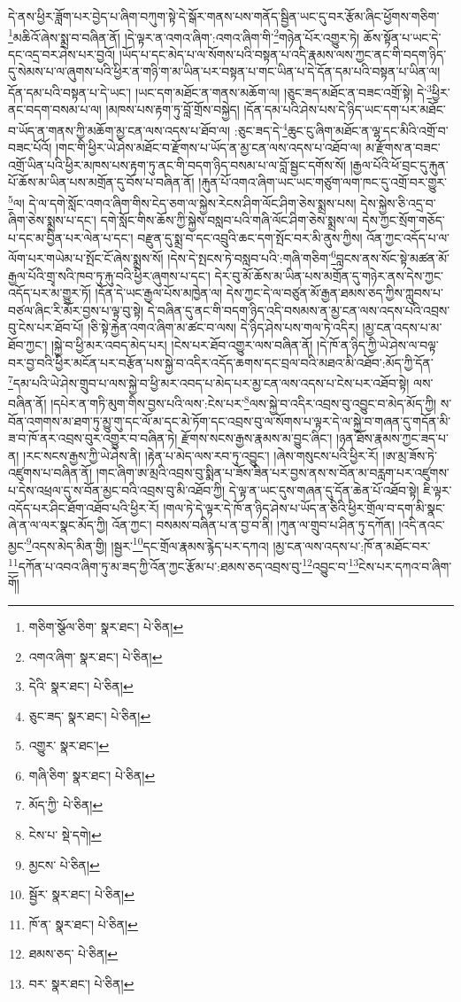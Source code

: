 དེ་ནས་ཕྱིར་ཟློག་པར་བྱེད་པ་ཞིག་བཀུག་སྟེ་དེ་སྒོར་གནས་པས་གནོད་སྦྱིན་ཡང་དུ་བར་རྩོམ་ཞིང་ཕྱོགས་གཅིག་\footnote{གཅིག་སྩོལ་ཅིག་  སྣར་ཐང་།  པེ་ཅིན། }མཆིའོ་ཞེས་སྨྲ་བ་བཞིན་ནོ། །དེ་ལྟར་ན་འགའ་ཞིག་:འགའ་ཞིག་གི་\footnote{འགའ་ཞིག་  སྣར་ཐང་།  པེ་ཅིན། }གཉེན་པོར་འགྱུར་ཏེ། ཆོས་སྟོན་པ་ཡང་དེ་དང་འདྲ་བར་ཤེས་པར་བྱའོ། །ཡོད་པ་དང་མེད་པ་ལ་སོགས་པའི་བསྟན་པ་འདི་རྣམས་ལས་ཀྱང་ནང་གི་བདག་ཉིད་དུ་སེམས་པ་ལ་ཞུགས་པའི་ཕྱིར་ན་གཉི་ག་མ་ཡིན་པར་བསྟན་པ་གང་ཡིན་པ་དེ་དོན་དམ་པའི་བསྟན་པ་ཡིན་ལ། དོན་དམ་པའི་བསྟན་པ་དེ་ཡང་། །ཡང་དག་མཐོང་ན་གནས་མཆོག་ལ། །ཅུང་ཟད་མཐོང་ན་བཟང་འགྲོ་སྟེ། དེ་\footnote{དེའི་  སྣར་ཐང་།  པེ་ཅིན། }ཕྱིར་ནང་བདག་བསམ་པ་ལ། །མཁས་པས་རྟག་ཏུ་བློ་གྲོས་བསྐྱེད། །དོན་དམ་པའི་ཤེས་པས་དེ་ཉིད་ཡང་དག་པར་མཐོང་བ་ཡོད་ན་གནས་ཀྱི་མཆོག་མྱ་ངན་ལས་འདས་པ་ཐོབ་ལ། :ཅུང་ཟད་དེ་\footnote{ཅུང་ཟད་  སྣར་ཐང་།  པེ་ཅིན། }ཆུང་ངུ་ཞིག་མཐོང་ན་ལྷ་དང་མིའི་འགྲོ་བ་བཟང་པོའོ། །གང་གི་ཕྱིར་ཡེ་ཤེས་མཐོང་བ་རྫོགས་པ་ཡོད་ན་མྱ་ངན་ལས་འདས་པ་འཐོབ་ལ། མ་རྫོགས་ན་བཟང་འགྲོ་ཡིན་པའི་ཕྱིར་མཁས་པས་རྟག་ཏུ་ནང་གི་བདག་ཉིད་བསམ་པ་ལ་བློ་སྦྱང་དགོས་སོ། །རྒྱལ་པོའི་ཕོ་བྲང་དུ་རྐུན་པོ་ཆོས་མ་ཡིན་པས་མགྲོན་དུ་བོས་པ་བཞིན་ནོ། །རྐུན་པོ་འགའ་ཞིག་ཡང་ཡང་གཙུག་ལག་ཁང་དུ་འགྲོ་བར་གྱུར་\footnote{འགྱུར་  སྣར་ཐང་། }ལ། དེ་ལ་དགེ་སློང་འགའ་ཞིག་གིས་ངེད་ཅག་ལ་སྐྱེས་རེངས་ཤིག་ལོང་ཤིག་ཅེས་སྨྲས་པས། དེས་སྐྱེས་ཅི་འདྲ་བ་ཞིག་ཅེས་སྨྲས་པ་དང་། དགེ་སློང་གིས་ཆོས་ཀྱི་སྐྱེས་བསླབ་པའི་གཞི་ལོང་ཤིག་ཅེས་སྨྲས་ལ། དེས་ཀྱང་སྲོག་གཅོད་པ་དང་མ་བྱིན་པར་ལེན་པ་དང་། བརྫུན་དུ་སྨྲ་བ་དང་འབྲུའི་ཆང་དག་སྤོང་བར་མི་ནུས་ཀྱིས། འོན་ཀྱང་འདོད་པ་ལ་ལོག་པར་གཡེམ་པ་སྤོང་ངོ་ཞེས་སྨྲས་སོ། །དེས་དེ་སྤངས་ཏེ་བསླབ་པའི་:གཞི་གཅིག་\footnote{གཞི་ཅིག་  སྣར་ཐང་།  པེ་ཅིན། }བླངས་ནས་སོང་སྟེ་མཚན་མོ་རྒྱལ་པོའི་གྲྭ་སའི་ཁབ་ཏུ་རྐུ་བའི་ཕྱིར་ཞུགས་པ་དང་། དེར་བུ་མོ་ཆོས་མ་ཡིན་པས་མགྲོན་དུ་གཉེར་ནས་དེས་ཀྱང་འདོད་པར་མ་གྱུར་ཏོ། །དོན་དེ་ཡང་རྒྱལ་པོས་མཁྱེན་ལ། དེས་ཀྱང་དེ་ལ་བཙུན་མོ་རྒྱན་ཐམས་ཅད་ཀྱིས་ཀླུབས་པ་བཙལ་ཞིང་རི་མོར་བྱས་པ་ལྟ་བུ་སྟེ། དེ་བཞིན་དུ་ནང་གི་བདག་ཉིད་འདི་བསམས་ན་མྱ་ངན་ལས་འདས་པའི་འབྲས་བུ་ངེས་པར་ཐོབ་པོ། །ཅི་སྟེ་རྐྱེན་འགའ་ཞིག་མ་ཚང་བ་ལས། དེ་ཉིད་ཤེས་པས་གལ་ཏེ་འདིར། །མྱ་ངན་འདས་པ་མ་ཐོབ་ཀྱང་། །སྐྱེ་བ་ཕྱི་མར་འབད་མེད་པར། །ངེས་པར་ཐོབ་འགྱུར་ལས་བཞིན་ནོ། །དེ་ཁོ་ན་ཉིད་ཀྱི་ཡེ་ཤེས་ལ་བལྟ་བར་བྱ་བའི་ཕྱིར་མངོན་པར་བརྩོན་པས་སྐྱེ་བ་འདིར་འདོད་ཆགས་དང་བྲལ་བའི་མཐའ་མི་འཐོབ་:མོད་ཀྱི་དོན་\footnote{མོད་ཀྱི་  པེ་ཅིན། }དམ་པའི་ཡེ་ཤེས་གྲུབ་པ་ལས་སྐྱེ་བ་ཕྱི་མར་འབད་པ་མེད་པར་མྱ་ངན་ལས་འདས་པ་ངེས་པར་འཐོབ་སྟེ། ལས་བཞིན་ནོ། །དཔེར་ན་གཏི་མུག་གིས་བྱས་པའི་ལས་:ངེས་པར་\footnote{ངེས་པ་  སྡེ་དགེ། }ལས་སྐྱེ་བ་འདིར་འབྲས་བུ་འབྱུང་བ་མེད་མོད་ཀྱི། ས་བོན་འགགས་མ་ཐག་ཏུ་མྱུ་གུ་དང་ལོ་མ་དང་མེ་ཏོག་དང་འབྲས་བུ་ལ་སོགས་པ་ལྟར་དེ་ལ་སྐྱེ་བ་གཞན་དུ་གདོན་མི་ཟ་བ་ཁོ་ནར་འབྲས་བུར་འགྱུར་བ་བཞིན་ཏེ། རྫོགས་སངས་རྒྱས་རྣམས་མ་བྱུང་ཞིང་། །ཉན་ཐོས་རྣམས་ཀྱང་ཟད་པ་ན། །རང་སངས་རྒྱས་ཀྱི་ཡེ་ཤེས་ནི། །རྟེན་པ་མེད་ལས་རབ་ཏུ་འབྱུང་། །ཞེས་གསུངས་པའི་ཕྱིར་རོ། །ཨ་མྲ་ཟོས་ཏེ་འཛུགས་པ་བཞིན་ནོ། །གང་ཞིག་ཨ་མྲའི་འབྲས་བུ་སྨིན་པ་ཟོས་ཟིན་པར་བྱས་ནས་ས་བོན་མ་བརླག་པར་འཛུགས་པ་དེས་འཕྲལ་དུ་ས་བོན་མྱང་བའི་འབྲས་བུ་མི་འཐོབ་ཀྱི། དེ་ལྟ་ན་ཡང་དུས་གཞན་དུ་དོན་ཆེན་པོ་འཐོབ་སྟེ། ཇི་ལྟར་འདོད་པར་ཤིང་ཐོག་འཐོབ་པའི་ཕྱིར་རོ། །གལ་ཏེ་དེ་ལྟར་དེ་ཁོ་ན་ཉིད་ཤེས་པ་ཡོད་ན་ཅིའི་ཕྱིར་གྲོལ་བ་དག་མི་སྣང་ཞེ་ན་ལ་ལར་སྣང་མོད་ཀྱི། འོན་ཀྱང་། བསམས་བཞིན་པ་ན་བྱ་བ་ནི། །ཀུན་ལ་གྲུབ་པ་ཤིན་ཏུ་དཀོན། །འདི་ནའང་མྱང་\footnote{མྱངས་  པེ་ཅིན། }འདས་མེད་མིན་གྱི། །སྦྱར་\footnote{སྦྱོར་  སྣར་ཐང་།  པེ་ཅིན། }དང་གྲོལ་རྣམས་རྙེད་པར་དཀའ། །མྱ་ངན་ལས་འདས་པ་:ཁོ་ན་མཐོང་བར་\footnote{ཁོ་ན་  སྣར་ཐང་།  པེ་ཅིན། }དཀོན་པ་འབའ་ཞིག་ཏུ་མ་ཟད་ཀྱི་འོན་ཀྱང་རྩོམ་པ་:ཐམས་ཅད་འབྲས་བུ་\footnote{ཐམས་ཅད་  པེ་ཅིན། }འབྱུང་བ་\footnote{བར་  སྣར་ཐང་།  པེ་ཅིན། }ངེས་པར་དཀའ་བ་ཞིག་གོ། 